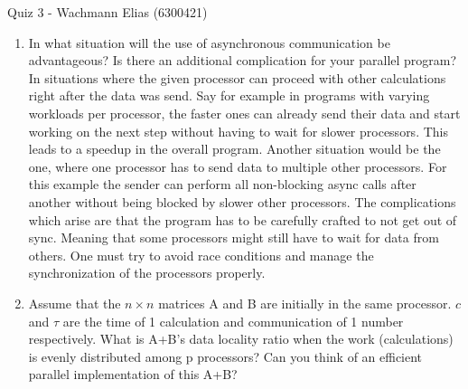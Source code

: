 \documentclass{article}
\begin{document}
% 

\huge Quiz 3 - Wachmann Elias (6300421)\\
\normalsize
\vspace{2cm}
\begin{enumerate}
    \item In what situation will the use of asynchronous communication be advantageous? Is there an additional complication for your parallel program?\\

    In situations where the given processor can proceed with other calculations right after the data was send. Say for example in programs with varying workloads per processor, the faster ones can already send their data and start working on the next step without having to wait for slower processors. This leads to a speedup in the overall program. Another situation would be the one, where one processor has to send data to multiple other processors. For this example the sender can perform all non-blocking async calls after another without being blocked by slower other processors. The complications which arise are that the program has to be carefully crafted to not get out of sync. Meaning that some processors might still have to wait for data from others. One must try to avoid race conditions and manage the synchronization of the processors properly. \\
    \item Assume that the $n \times n$ matrices A and B are initially in the same processor. $c$ and $\tau$ are the time of 1 calculation and communication of 1 number respectively. What is A+B's data locality ratio when the work (calculations) is evenly distributed among p processors? Can you think of an efficient parallel implementation of this A+B?\\
    

\end{enumerate}
\end{document}
